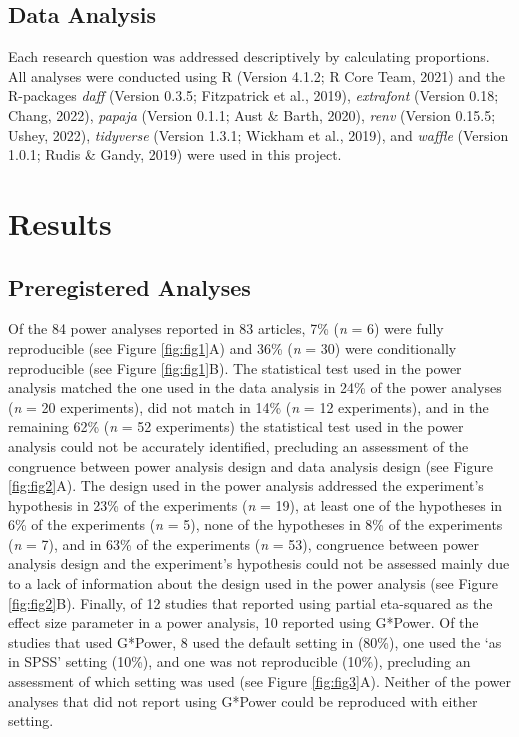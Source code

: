 \documentclass[
  doc, donotrepeattitle,floatsintext]{apa7}
\begin{document}
\hypertarget{data-analysis}{%
\subsection{Data Analysis}\label{data-analysis}}

Each research question was addressed descriptively by calculating proportions. All analyses were conducted using R (Version 4.1.2; R Core Team, 2021) and the R-packages \emph{daff} (Version 0.3.5; Fitzpatrick et al., 2019), \emph{extrafont} (Version 0.18; Chang, 2022), \emph{papaja} (Version 0.1.1; Aust \& Barth, 2020), \emph{renv} (Version 0.15.5; Ushey, 2022), \emph{tidyverse} (Version 1.3.1; Wickham et al., 2019), and \emph{waffle} (Version 1.0.1; Rudis \& Gandy, 2019) were used in this project.

\hypertarget{results}{%
\section{Results}\label{results}}

\hypertarget{preregistered-analyses}{%
\subsection{Preregistered Analyses}\label{preregistered-analyses}}

Of the 84 power analyses reported in 83 articles, 7\% (\emph{n} = 6) were fully reproducible (see Figure \ref{fig:fig1}A) and 36\% (\emph{n} = 30) were conditionally reproducible (see Figure \ref{fig:fig1}B). The statistical test used in the power analysis matched the one used in the data analysis in 24\% of the power analyses (\emph{n} = 20 experiments), did not match in 14\% (\emph{n} = 12 experiments), and in the remaining 62\% (\emph{n} = 52 experiments) the statistical test used in the power analysis could not be accurately identified, precluding an assessment of the congruence between power analysis design and data analysis design (see Figure \ref{fig:fig2}A). The design used in the power analysis addressed the experiment's hypothesis in 23\% of the experiments (\emph{n} = 19), at least one of the hypotheses in 6\% of the experiments (\emph{n} = 5), none of the hypotheses in 8\% of the experiments (\emph{n} = 7), and in 63\% of the experiments (\emph{n} = 53), congruence between power analysis design and the experiment's hypothesis could not be assessed mainly due to a lack of information about the design used in the power analysis (see Figure \ref{fig:fig2}B). Finally, of 12 studies that reported using partial eta-squared as the effect size parameter in a power analysis, 10 reported using G*Power. Of the studies that used G*Power, 8 used the default setting in (80\%), one used the `as in SPSS' setting (10\%), and one was not reproducible (10\%), precluding an assessment of which setting was used (see Figure \ref{fig:fig3}A). Neither of the power analyses that did not report using G*Power could be reproduced with either setting.
\end{document}
